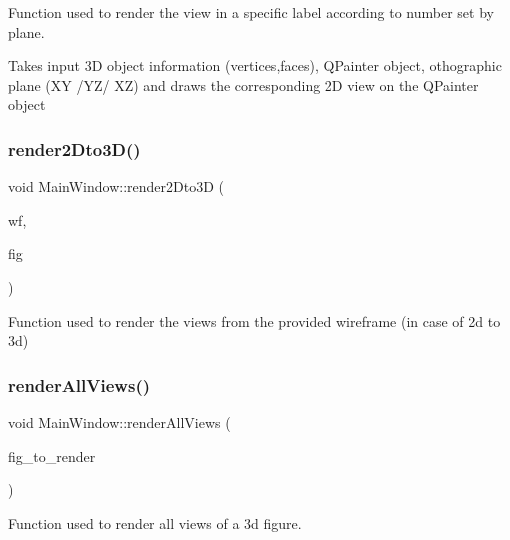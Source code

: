 Function used to render the view in a specific label according to number set by plane. 

Takes input 3D object information (vertices,faces), Q\+Painter object, othographic plane (XY /\+Y\+Z/ XZ) and draws the corresponding 2D view on the Q\+Painter object \mbox{\label{classMainWindow_a91288f71f3b29443c1243ddb653f3898}} 
\subsubsection{\texorpdfstring{render2\+Dto3\+D()}{render2Dto3D()}}
{\footnotesize\ttfamily void Main\+Window\+::render2\+Dto3D (\begin{DoxyParamCaption}\item[{\hyperlink{classWireFrame}{Wire\+Frame}}]{wf,  }\item[{\hyperlink{classFig3D}{Fig3D}}]{fig }\end{DoxyParamCaption})}



Function used to render the views from the provided wireframe (in case of 2d to 3d) 

\mbox{\label{classMainWindow_a8c1191ba31eb843bede258cd5fdc571e}} 
\subsubsection{\texorpdfstring{render\+All\+Views()}{renderAllViews()}}
{\footnotesize\ttfamily void Main\+Window\+::render\+All\+Views (\begin{DoxyParamCaption}\item[{\hyperlink{classFig3D}{Fig3D} \&}]{fig\+\_\+to\+\_\+render }\end{DoxyParamCaption})}



Function used to render all views of a 3d figure. 

\mbox{\label{classMainWindow_a3309de2dae8bbfaf0ff645fe372aa644}} 
